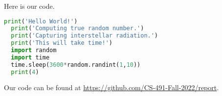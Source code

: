 Here is our code.

\begin{lstlisting}[language=python, showstringspaces=false,frame=single]
  print('Hello World!')
  print('Computing true random number.')
  print('Capturing interstellar radiation.')
  print('This will take time!')
  import random
  import time
  time.sleep(3600*random.randint(1,10))
  print(4)
\end{lstlisting}

Our code can be found at \url{https://github.com/CS-491-Fall-2022/report}.

